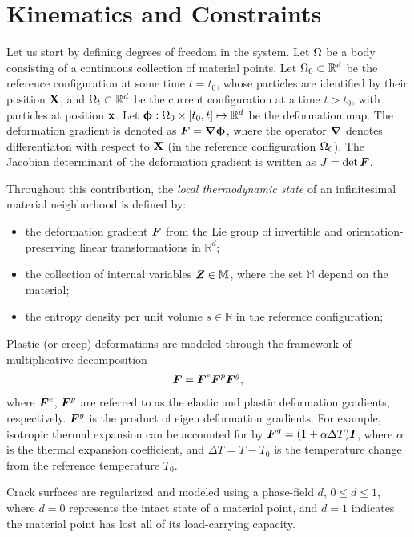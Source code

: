 \section{Kinematics and Constraints}
\label{section: framework/kinematics}

Let us start by defining degrees of freedom in the system. Let $\Omega$ be a body consisting of a continuous collection of material points. Let $\Omega_0 \subset \mathbb{R}^d$ be the reference configuration at some time $t = t_0$, whose particles are identified by their position $\textbf{X}$, and $\Omega_t \subset \mathbb{R}^d$ be the current configuration at a time $t > t_0$, with particles at position $\textbf{x}$. Let $\boldsymbol{\upphi}: \Omega_0 \times [t_0, t] \mapsto \mathbb{R}^d$ be the deformation map.
The deformation gradient is denoted as $\boldsymbol{F} = \boldsymbol{\nabla} \boldsymbol{\upphi}$, where the operator $\boldsymbol{\nabla}$ denotes differentiaton with respect to $\textbf{X}$ (in the reference configuration $\Omega_0$). The Jacobian determinant of the deformation gradient is written as $J = \det\boldsymbol{F}$.

Throughout this contribution, the \emph{local thermodynamic state} of an infinitesimal material neighborhood is defined by:
\begin{itemize}
  \item the deformation gradient $\boldsymbol{F}$ from the Lie group of invertible and orientation-preserving linear transformations in $\mathbb{R}^d$;
  \item the collection of internal variables $\boldsymbol{Z} \in \mathbb{M}$, where the set $\mathbb{M}$ depend on the material;
  \item the entropy density per unit volume $s \in \mathbb{R}$ in the reference configuration;
\end{itemize}

Plastic (or creep) deformations are modeled through the framework of multiplicative decomposition
\begin{align}
  \boldsymbol{F} = \boldsymbol{F}^e \boldsymbol{F}^p \boldsymbol{F}^g,
\end{align}
where $\boldsymbol{F}^e$, $\boldsymbol{F}^p$ are referred to as the elastic and plastic deformation gradients, respectively. $\boldsymbol{F}^g$ is the product of eigen deformation gradients. For example, isotropic thermal expansion can be accounted for by $\boldsymbol{F}^g = (1+\alpha \Delta T)\boldsymbol{I}$, where $\alpha$ is the thermal expansion coefficient, and $\Delta T = T - T_0$ is the temperature change from the reference temperature $T_0$.

Crack surfaces are regularized and modeled using a phase-field $d$, $0 \leqslant d \leqslant 1$, where $d = 0$ represents the intact state of a material point, and $d = 1$ indicates the material point has lost all of its load-carrying capacity.

